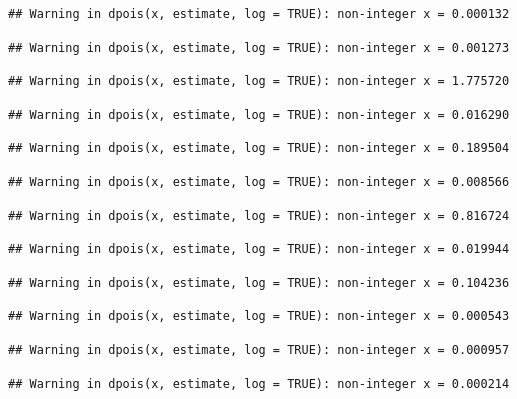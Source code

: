 \documentclass[]{article}
\begin{document}
\begin{verbatim}
## Warning in dpois(x, estimate, log = TRUE): non-integer x = 0.000132
\end{verbatim}

\begin{verbatim}
## Warning in dpois(x, estimate, log = TRUE): non-integer x = 0.001273
\end{verbatim}

\begin{verbatim}
## Warning in dpois(x, estimate, log = TRUE): non-integer x = 1.775720
\end{verbatim}

\begin{verbatim}
## Warning in dpois(x, estimate, log = TRUE): non-integer x = 0.016290
\end{verbatim}

\begin{verbatim}
## Warning in dpois(x, estimate, log = TRUE): non-integer x = 0.189504
\end{verbatim}

\begin{verbatim}
## Warning in dpois(x, estimate, log = TRUE): non-integer x = 0.008566
\end{verbatim}

\begin{verbatim}
## Warning in dpois(x, estimate, log = TRUE): non-integer x = 0.816724
\end{verbatim}

\begin{verbatim}
## Warning in dpois(x, estimate, log = TRUE): non-integer x = 0.019944
\end{verbatim}

\begin{verbatim}
## Warning in dpois(x, estimate, log = TRUE): non-integer x = 0.104236
\end{verbatim}

\begin{verbatim}
## Warning in dpois(x, estimate, log = TRUE): non-integer x = 0.000543
\end{verbatim}

\begin{verbatim}
## Warning in dpois(x, estimate, log = TRUE): non-integer x = 0.000957
\end{verbatim}

\begin{verbatim}
## Warning in dpois(x, estimate, log = TRUE): non-integer x = 0.000214
\end{verbatim}
\end{document}
